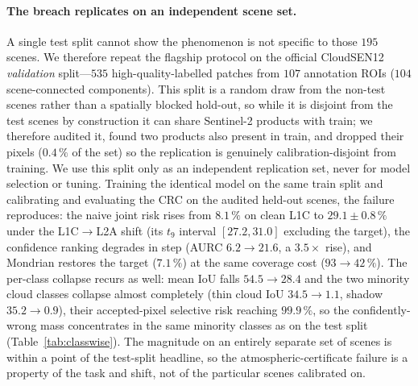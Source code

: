 \documentclass[preprint,3p,times]{elsarticle}
\begin{document}
\paragraph{The breach replicates on an independent scene set.} A single test split cannot show the phenomenon is not specific to those $195$ scenes. We therefore repeat the flagship protocol on the official CloudSEN12 \emph{validation} split---$535$ high-quality-labelled patches from $107$ annotation ROIs ($104$ scene-connected components). This split is a random draw from the non-test scenes rather than a spatially blocked hold-out, so while it is disjoint from the test scenes by construction it can share Sentinel-2 products with train; we therefore audited it, found two products also present in train, and dropped their pixels ($0.4\,\%$ of the set) so the replication is genuinely calibration-disjoint from training. We use this split only as an independent replication set, never for model selection or tuning. Training the identical model on the same train split and calibrating and evaluating the CRC on the audited held-out scenes, the failure reproduces: the naive joint risk rises from $8.1\,\%$ on clean L1C to $29.1 \pm 0.8\,\%$ under the L1C$\to$L2A shift (its $t_9$ interval $[27.2, 31.0]$ excluding the target), the confidence ranking degrades in step (AURC $6.2 \to 21.6$, a $3.5\times$ rise), and Mondrian restores the target ($7.1\,\%$) at the same coverage cost ($93 \to 42\,\%$). The per-class collapse recurs as well: mean IoU falls $54.5 \to 28.4$ and the two minority cloud classes collapse almost completely (thin cloud IoU $34.5 \to 1.1$, shadow $35.2 \to 0.9$), their accepted-pixel selective risk reaching $99.9\,\%$, so the confidently-wrong mass concentrates in the same minority classes as on the test split (Table~\ref{tab:classwise}). The magnitude on an entirely separate set of scenes is within a point of the test-split headline, so the atmospheric-certificate failure is a property of the task and shift, not of the particular scenes calibrated on.
\end{document}

